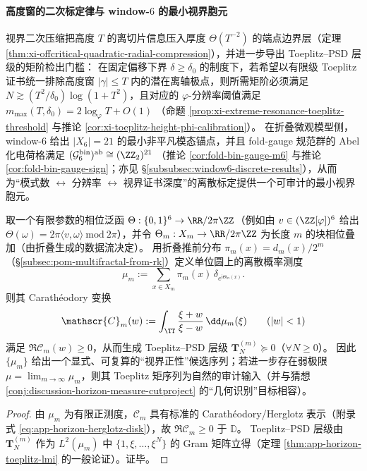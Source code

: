\paragraph{高度窗的二次标定律与 window-\texorpdfstring{\(6\)}{6} 的最小视界胞元}
视界二次压缩把高度 \(T\) 的离切片信息压入厚度 \(\Theta(T^{-2})\) 的端点边界层（定理 \ref{thm:xi-offcritical-quadratic-radial-compression}），并进一步导出 Toeplitz--PSD 层级的矩阶检出门槛：
在固定偏移下界 \(\delta\ge\delta_0\) 的制度下，若希望以有限级 Toeplitz 证书统一排除高度窗 \(|\gamma|\le T\) 内的潜在离轴极点，则所需矩阶必须满足
\(
N\gtrsim (T^2/\delta_0)\log(1+T^2)
\)，且对应的 \(\varphi\)-分辨率阈值满足
\(
m_{\max}(T,\delta_0)=2\log_{\varphi}T+O(1)
\)
（命题 \ref{prop:xi-extreme-resonance-toeplitz-threshold} 与推论 \ref{cor:xi-toeplitz-height-phi-calibration}）。
在折叠微观模型侧，window-\(6\) 给出 \(|X_6|=21\) 的最小非平凡模态锚点，并且 fold-gauge 规范群的 Abel 化电荷格满足
\(
(\mathcal{G}^{\mathrm{bin}}_6)^{\mathrm{ab}}\cong(\ZZ_2)^{21}
\)
（推论 \ref{cor:fold-bin-gauge-m6} 与推论 \ref{cor:fold-bin-gauge-sign}；亦见 \S\ref{subsubsec:window6-discrete-results}），从而为“模式数 \(\leftrightarrow\) 分辨率 \(\leftrightarrow\) 视界证书深度”的离散标定提供一个可审计的最小视界胞元。

\begin{proposition}\label{prop:discussion-horizon-measure-fold6-pushforward}
取一个有限参数的相位泛函 \(\Theta:\{0,1\}^6\to\RR/2\pi\ZZ\)（例如由 \(v\in(\ZZ[\varphi])^6\) 给出 \(\Theta(\omega)=2\pi\langle v,\omega\rangle\ \mathrm{mod}\ 2\pi\)），并令 \(\Theta_m:X_m\to\RR/2\pi\ZZ\) 为长度 \(m\) 的块相位叠加（由折叠生成的数据流决定）。
用折叠推前分布 \(\pi_m(x)=d_m(x)/2^m\)（\S\ref{subsec:pom-multifractal-from-rk}）定义单位圆上的离散概率测度
\[
\mu_m:=\sum_{x\in X_m}\pi_m(x)\,\delta_{e^{\mathrm{i}\Theta_m(x)}}.
\]
则其 Carath\'eodory 变换
\[
\mathscr{C}_m(w):=\int_{\TT}\frac{\xi+w}{\xi-w}\,\dd\mu_m(\xi)
\qquad(|w|<1)
\]
满足 \(\Re\mathscr{C}_m(w)\ge 0\)，从而生成 Toeplitz--PSD 层级 \(\mathbf{T}^{(m)}_N\succeq 0\)（\(\forall N\ge 0\)）。
因此 \(\{\mu_m\}\) 给出一个显式、可复算的“视界正性”候选序列；若进一步存在弱极限 \(\mu=\lim_{m\to\infty}\mu_m\)，则其 Toeplitz 矩序列为自然的审计输入（并与猜想 \ref{conj:discussion-horizon-measure-cutproject} 的“几何识别”目标相容）。
\end{proposition}
\begin{proof}
由 \(\mu_m\) 为有限正测度，\(\mathscr{C}_m\) 具有标准的 Carath\'eodory/Herglotz 表示（附录式 \eqref{eq:app-horizon-herglotz-disk}），故 \(\Re\mathscr{C}_m\ge 0\) 于 \(\mathbb{D}\)。
Toeplitz--PSD 层级由 \(\mathbf{T}^{(m)}_N\) 作为 \(L^2(\mu_m)\) 中 \(\{1,\xi,\dots,\xi^N\}\) 的 Gram 矩阵立得（定理 \ref{thm:app-horizon-toeplitz-lmi} 的一般论证）。证毕。
\end{proof}

